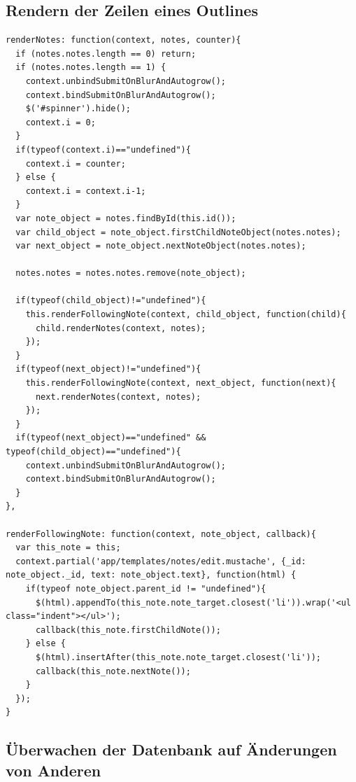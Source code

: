 \subsection{Rendern der Zeilen eines Outlines}

\lstset{language=javascript}
\medskip 
\begin{lstlisting}[label=code:rendernotes, caption=Auszug aus {\fontfamily{pcr}\selectfont /\_attachments/app/helpers/note\_element.js}]
renderNotes: function(context, notes, counter){
  if (notes.notes.length == 0) return;
  if (notes.notes.length == 1) {
    context.unbindSubmitOnBlurAndAutogrow();
    context.bindSubmitOnBlurAndAutogrow();
    $('#spinner').hide();
    context.i = 0;
  }
  if(typeof(context.i)=="undefined"){
    context.i = counter;
  } else {
    context.i = context.i-1;
  }
  var note_object = notes.findById(this.id());
  var child_object = note_object.firstChildNoteObject(notes.notes);
  var next_object = note_object.nextNoteObject(notes.notes);
  
  notes.notes = notes.notes.remove(note_object);
  
  if(typeof(child_object)!="undefined"){
    this.renderFollowingNote(context, child_object, function(child){
      child.renderNotes(context, notes);
    });
  } 
  if(typeof(next_object)!="undefined"){
    this.renderFollowingNote(context, next_object, function(next){
      next.renderNotes(context, notes);
    });
  }
  if(typeof(next_object)=="undefined" && typeof(child_object)=="undefined"){
    context.unbindSubmitOnBlurAndAutogrow();
    context.bindSubmitOnBlurAndAutogrow();
  }
},

renderFollowingNote: function(context, note_object, callback){
  var this_note = this;
  context.partial('app/templates/notes/edit.mustache', {_id: note_object._id, text: note_object.text}, function(html) {
    if(typeof note_object.parent_id != "undefined"){
      $(html).appendTo(this_note.note_target.closest('li')).wrap('<ul class="indent"></ul>');
      callback(this_note.firstChildNote());
    } else {
      $(html).insertAfter(this_note.note_target.closest('li'));
      callback(this_note.nextNote());        
    }
  });
}
\end{lstlisting}




\subsection{Überwachen der Datenbank auf Änderungen von Anderen}

